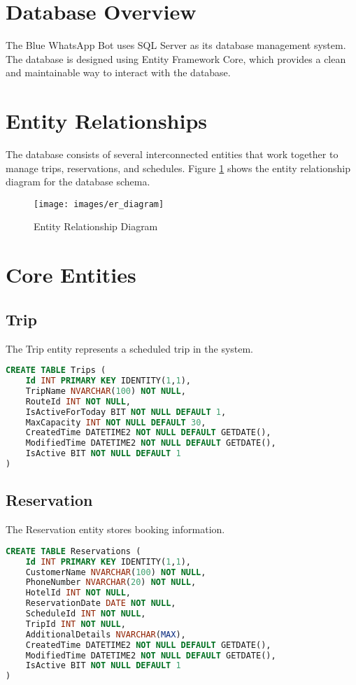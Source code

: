 \section{Database Overview}
The Blue WhatsApp Bot uses SQL Server as its database management system. The database is designed using Entity Framework Core, which provides a clean and maintainable way to interact with the database.

\section{Entity Relationships}
The database consists of several interconnected entities that work together to manage trips, reservations, and schedules. Figure \ref{fig:er-diagram} shows the entity relationship diagram for the database schema.

\begin{figure}[h]
    \centering
    \texttt{[image: images/er\_diagram]}
    \caption{Entity Relationship Diagram}
    \label{fig:er-diagram}
\end{figure}

\section{Core Entities}

\subsection{Trip}
The Trip entity represents a scheduled trip in the system.

\begin{lstlisting}[language=SQL]
CREATE TABLE Trips (
    Id INT PRIMARY KEY IDENTITY(1,1),
    TripName NVARCHAR(100) NOT NULL,
    RouteId INT NOT NULL,
    IsActiveForToday BIT NOT NULL DEFAULT 1,
    MaxCapacity INT NOT NULL DEFAULT 30,
    CreatedTime DATETIME2 NOT NULL DEFAULT GETDATE(),
    ModifiedTime DATETIME2 NOT NULL DEFAULT GETDATE(),
    IsActive BIT NOT NULL DEFAULT 1
)
\end{lstlisting}

\subsection{Reservation}
The Reservation entity stores booking information.

\begin{lstlisting}[language=SQL]
CREATE TABLE Reservations (
    Id INT PRIMARY KEY IDENTITY(1,1),
    CustomerName NVARCHAR(100) NOT NULL,
    PhoneNumber NVARCHAR(20) NOT NULL,
    HotelId INT NOT NULL,
    ReservationDate DATE NOT NULL,
    ScheduleId INT NOT NULL,
    TripId INT NOT NULL,
    AdditionalDetails NVARCHAR(MAX),
    CreatedTime DATETIME2 NOT NULL DEFAULT GETDATE(),
    ModifiedTime DATETIME2 NOT NULL DEFAULT GETDATE(),
    IsActive BIT NOT NULL DEFAULT 1
)
\end{lstlisting}

